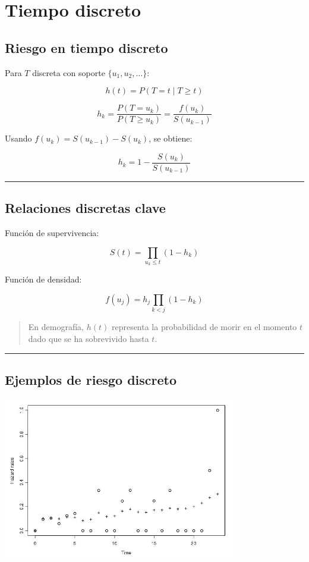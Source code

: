 \documentclass[
  letterpaper,
  DIV=11,
  numbers=noendperiod]{scrartcl}
\begin{document}
\section{Tiempo discreto}\label{tiempo-discreto}

\subsection{Riesgo en tiempo discreto}\label{riesgo-en-tiempo-discreto}

Para \(T\) discreta con soporte \(\{u_1, u_2, \dots\}\):

\[
h(t) = P(T = t \mid T \ge t)
\]

\[
h_k = \frac{P(T = u_k)}{P(T \ge u_k)} = \frac{f(u_k)}{S(u_{k-1})}
\]

Usando \(f(u_k) = S(u_{k-1}) - S(u_k)\), se obtiene:

\[
h_k = 1 - \frac{S(u_k)}{S(u_{k-1})}
\]

\begin{center}\rule{0.5\linewidth}{0.5pt}\end{center}

\subsection{Relaciones discretas
clave}\label{relaciones-discretas-clave}

Función de supervivencia:

\[
S(t) = \prod_{u_k \le t} (1 - h_k)
\]

Función de densidad:

\[
f(u_j) = h_j \prod_{k<j} (1 - h_k)
\]

\begin{quote}
En demografía, \(h(t)\) representa la probabilidad de morir en el
momento \(t\) dado que se ha sobrevivido hasta \(t\).
\end{quote}

\begin{center}\rule{0.5\linewidth}{0.5pt}\end{center}

\subsection{Ejemplos de riesgo
discreto}\label{ejemplos-de-riesgo-discreto}

\begin{center}
\includegraphics[width=4in,height=\textheight,keepaspectratio]{figura/ejempRiesgoDiscreto.jpg}
\end{center}
\end{document}
